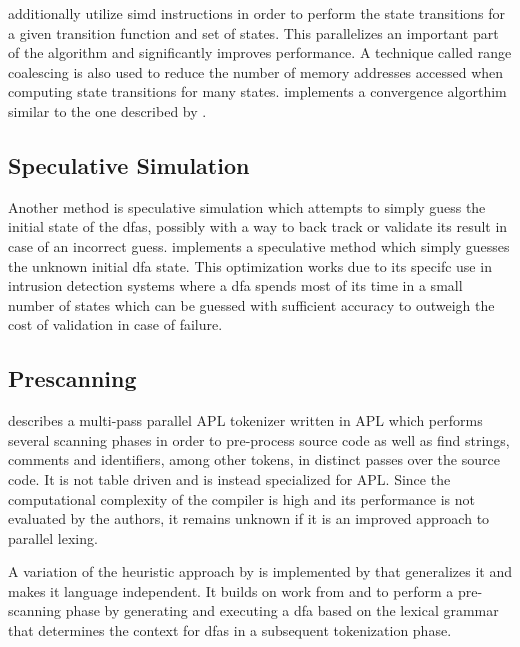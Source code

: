 \cite{mytkowicz_data-parallel_2014} additionally utilize \gls{simd} instructions
in order to perform the state transitions for a given transition function
and set of states. This parallelizes an important part of the algorithm and
significantly improves performance. A technique called range coalescing is also
used to reduce the number of memory addresses accessed when computing state
transitions for many states. \cite{zhao_--fly_2015} implements a convergence
algorthim similar to the one described by \cite{mytkowicz_data-parallel_2014}.

\subsection{Speculative Simulation} \label{speculative_simulation}

Another method is speculative simulation which attempts to simply guess the
initial state of the \gls{dfa}s, possibly with a way to back track or validate
its result in case of an incorrect guess. \cite{luchaup_multi-byte_2009,
luchaup_speculative_2011} implements a speculative method which simply guesses
the unknown initial \gls{dfa} state. This optimization works due to its specifc
use in intrusion detection systems where a \gls{dfa} spends most of its time
in a small number of states which can be guessed with sufficient accuracy to
outweigh the cost of validation in case of failure.

\subsection{Prescanning} \label{lit_prescanning}

\cite{bernecky_spmdsimd_2003} describes a multi-pass parallel APL tokenizer
written in APL which performs several scanning phases in order to pre-process
source code as well as find strings, comments and identifiers, among other
tokens, in distinct passes over the source code. It is not table driven and is
instead specialized for APL. Since the computational complexity of the compiler
is high and its performance is not evaluated by the authors, it remains unknown
if it is an improved approach to parallel lexing.

A variation of the heuristic approach by \cite{barenghi_parallel_2015} is
implemented by \cite{li_plex_2021} that generalizes it and makes it language
independent. It builds on work from \cite{sinya_simultaneous_2013} and
\cite{zhao_--fly_2015} to perform a pre-scanning phase by generating and
executing a \gls{dfa} based on the lexical grammar that determines the context
for \glspl{dfa} in a subsequent tokenization phase.


